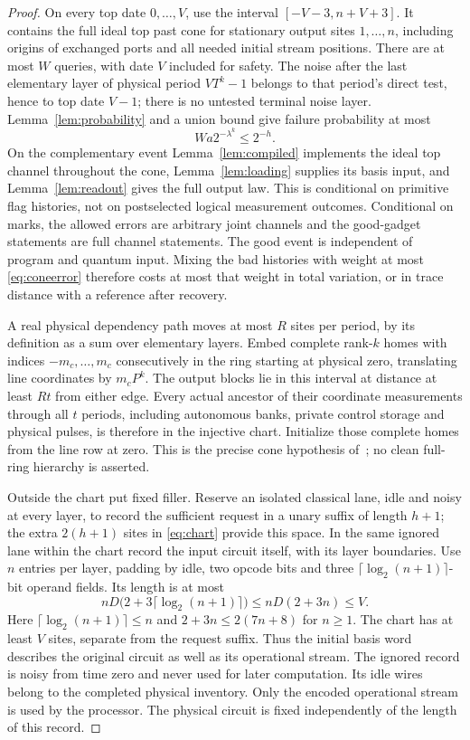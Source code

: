 \begin{proof}
On every top date $0,\ldots,V$, use the interval $[-V-3,n+V+3]$. It contains the full ideal top past cone for stationary output sites $1,\ldots,n$, including origins of exchanged ports and all needed initial stream positions. There are at most $W$ queries, with date $V$ included for safety. The noise after the last elementary layer of physical period $VT^k-1$ belongs to that period's direct test, hence to top date $V-1$; there is no untested terminal noise layer. Lemma~\ref{lem:probability} and a union bound give failure probability at most
\begin{equation}\label{eq:coneerror}
 Wa2^{-\lambda^k}\le2^{-h}.
\end{equation}
On the complementary event Lemma~\ref{lem:compiled} implements the ideal top channel throughout the cone, Lemma~\ref{lem:loading} supplies its basis input, and Lemma~\ref{lem:readout} gives the full output law. This is conditional on primitive flag histories, not on postselected logical measurement outcomes. Conditional on marks, the allowed errors are arbitrary joint channels and the good-gadget statements are full channel statements. The good event is independent of program and quantum input. Mixing the bad histories with weight at most \eqref{eq:coneerror} therefore costs at most that weight in total variation, or in trace distance with a reference after recovery.

A real physical dependency path moves at most $R$ sites per period, by its definition as a sum over elementary layers. Embed complete rank-$k$ homes with indices $-m_c,\ldots,m_c$ consecutively in the ring starting at physical zero, translating line coordinates by $m_cP^k$. The output blocks lie in this interval at distance at least $Rt$ from either edge. Every actual ancestor of their coordinate measurements through all $t$ periods, including autonomous banks, private control storage and physical pulses, is therefore in the injective chart. Initialize those complete homes from the line row at zero. This is the precise cone hypothesis of~\cite[Lemma~12.6]{DMMemory2026}; no clean full-ring hierarchy is asserted.

Outside the chart put fixed filler. Reserve an isolated classical lane, idle and noisy at every layer, to record the sufficient request in a unary suffix of length $h+1$; the extra $2(h+1)$ sites in \eqref{eq:chart} provide this space. In the same ignored lane within the chart record the input circuit itself, with its layer boundaries. Use $n$ entries per layer, padding by idle, two opcode bits and three $\lceil\log_2(n+1)\rceil$-bit operand fields. Its length is at most
\[
 nD\bigl(2+3\lceil\log_2(n+1)\rceil\bigr)
 \le nD(2+3n)\le V.
\]
Here $\lceil\log_2(n+1)\rceil\le n$ and $2+3n\le2(7n+8)$ for $n\ge1$. The chart has at least $V$ sites, separate from the request suffix. Thus the initial basis word describes the original circuit as well as its operational stream. The ignored record is noisy from time zero and never used for later computation. Its idle wires belong to the completed physical inventory. Only the encoded operational stream is used by the processor. The physical circuit is fixed independently of the length of this record.


\end{proof}
